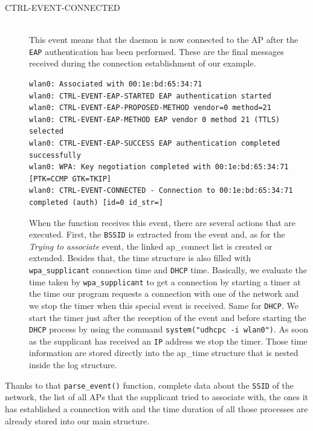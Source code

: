 \begin{description}
	\item[CTRL-EVENT-CONNECTED]\hfill \\
	This event means that the daemon is now connected to the AP after the \texttt{EAP} authentication has been performed. These are the final messages received during the connection establishment of our example.\\

\begin{lstlisting}[frame=single,breaklines=true,caption={Example of a connection to the \texttt{student.UCLouvain} network}]
wlan0: Associated with 00:1e:bd:65:34:71
wlan0: CTRL-EVENT-EAP-STARTED EAP authentication started
wlan0: CTRL-EVENT-EAP-PROPOSED-METHOD vendor=0 method=21
wlan0: CTRL-EVENT-EAP-METHOD EAP vendor 0 method 21 (TTLS) selected
wlan0: CTRL-EVENT-EAP-SUCCESS EAP authentication completed successfully
wlan0: WPA: Key negotiation completed with 00:1e:bd:65:34:71 [PTK=CCMP GTK=TKIP]
wlan0: CTRL-EVENT-CONNECTED - Connection to 00:1e:bd:65:34:71 completed (auth) [id=0 id_str=]
\end{lstlisting}

When the function receives this event, there are several actions that are executed. First, the \texttt{BSSID} is extracted from the event and, as for the \textit{Trying to associate} event, the linked ap\_connect list is created or extended. Besides that, the time structure is also filled with \texttt{wpa\_supplicant} connection time and \texttt{DHCP} time. Basically, we evaluate the time taken by \texttt{wpa\_supplicant} to get a connection by starting a timer at the time our program requests a connection with one of the network and we stop the timer when this special event is received. Same for \texttt{DHCP}. We start the timer just after the reception of the event and before starting the \texttt{DHCP} process by using the command \texttt{system("udhcpc -i wlan0")}. As soon as the supplicant has received an \texttt{IP} address we stop the timer. Those time information are stored directly into the ap\_time structure that is nested inside the log structure.

\end{description}

Thanks to that \texttt{parse\_event()} function, complete data about the \texttt{SSID} of the network, the list of all APs that the supplicant tried to associate with, the ones it has established a connection with and the time duration of all those processes are already stored into our main structure.


